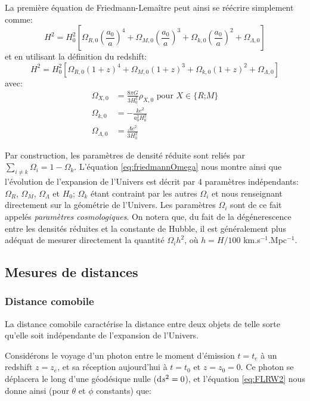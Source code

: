 \documentclass[../main/main.tex]{subfiles}
\begin{document}
La première équation de Friedmann-Lemaître peut ainsi se réécrire
simplement comme:
\begin{equation}
  \label{eq:friedmannOmega}
  H^{2}=H_{0}^{2}\left[\Omega_{R,0}\left(\frac{a_{0}}{a}\right)^{4}
    +\Omega_{M,0}\left(\frac{a_{0}}{a}\right)^{3} +\Omega_{k,0}\left(\frac{a_{0}}{a}\right)^{2}+\Omega_{\Lambda,0} \right]
\end{equation}
et en utilisant la définition du redshift:
\begin{equation}
  \label{eq:friedmannZ}
  H^{2}=H_{0}^{2}\left[\Omega_{R,0}(1+z)^{4}
    +\Omega_{M,0}(1+z)^{3} +\Omega_{k,0}(1+z)^{2}+\Omega_{\Lambda,0} \right]
\end{equation}
avec:
\begin{align*}
  \Omega_{X,0}&=\frac{8\pi G}{3H_{0}^{2}}\rho_{X,0} \text{ pour
  $X\in$\{$R$;$M$\}}\\
  \Omega_{k,0}&=-\frac{kc^{2}}{a_{0}^{2}H_{0}^{2}}\\
  \Omega_{\Lambda,0}&=\frac{\Lambda c^{2}}{3H_{0}^{2}}
\end{align*}

Par construction, les paramètres de densité réduite sont reliés par
$\sum_{i\ne k}\Omega_{i}=1-\Omega_{k}$.
L'équation \ref{eq:friedmannOmega} nous montre ainsi que l'évolution de
l'expansion de l'Univers est décrit par 4 paramètres indépendants:
$\Omega_{R}$, $\Omega_{M}$, $\Omega_{\Lambda}$ et $H_{0}$; $\Omega_{k}$
étant contraint par les autres $\Omega_{i}$ et nous renseignant
directement sur la géométrie de l'Univers. Les paramètres $\Omega_{i}$
sont de ce fait appelés \textit{paramètres cosmologiques}. On notera
que, du fait de 
la dégénerescence entre les densités réduites et la constante de Hubble,
il est généralement plus adéquat de mesurer directement la quantité
$\Omega_{i}h^{2}$, où $h=H/100$ km.s$^{-1}$.Mpc$^{-1}$.

\subsection{Mesures de distances}

\subsubsection*{Distance comobile}
La distance comobile caractérise la distance entre deux objets
de telle sorte qu'elle soit indépendante de l'expansion de
l'Univers.

Considérons le voyage d'un photon entre le moment d'émission $t=t_{e}$
à un redshift $z=z_{e}$, et sa réception aujourd'hui à $t=t_{0}$ et
$z=z_{0}=0$. Ce photon se déplacera le long d'une géodésique nulle ($\mathrm{d}
s^{2}=0$), et l'équation \ref{eq:FLRW2} nous donne ainsi (pour $\theta$
et $\phi$ constants) que:
\end{document}
